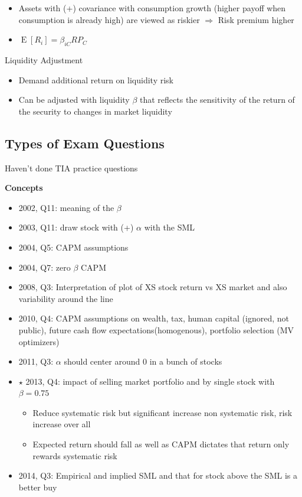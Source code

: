 \documentclass[]{book}
\providecommand{\tightlist}{%
  \setlength{\itemsep}{0pt}\setlength{\parskip}{0pt}}
\theoremstyle{definition}
\theoremstyle{definition}
\theoremstyle{remark}
\begin{document}
\begin{itemize}
\item
  Assets with (+) covariance with consumption growth (higher payoff when
  consumption is already high) are viewed as riskier \(\Rightarrow\)
  Risk premium higher
\item
  \(\operatorname{E}[R_i] = \beta_{iC}RP_C\)
\end{itemize}

Liquidity Adjustment

\begin{itemize}
\item
  Demand additional return on liquidity risk
\item
  Can be adjusted with liquidity \(\beta\) that reflects the sensitivity
  of the return of the security to changes in market liquidity
\end{itemize}

\subsection{Types of Exam Questions}\label{types-of-exam-questions-3}

{Haven't done TIA practice questions}

\textbf{Concepts}

\begin{itemize}
\tightlist
\item
  2002, Q11: meaning of the \(\beta\)
\item
  2003, Q11: draw stock with (+) \(\alpha\) with the SML
\item
  2004, Q5: CAPM assumptions
\item
  2004, Q7: zero \(\beta\) CAPM
\item
  2008, Q3: Interpretation of plot of XS stock return vs XS market and
  also variability around the line
\item
  2010, Q4: CAPM assumptions on wealth, tax, human capital (ignored, not
  public), future cash flow expectations(homogenous), portfolio
  selection (MV optimizers)
\item
  2011, Q3: \(\alpha\) should center around 0 in a bunch of stocks
\item
  \(\star\) 2013, Q4: impact of selling market portfolio and by single
  stock with \(\beta = 0.75\)

  \begin{itemize}
  \tightlist
  \item
    Reduce systematic risk but significant increase non systematic risk,
    risk increase over all
  \item
    Expected return should fall as well as CAPM dictates that return
    only rewards systematic risk
  \end{itemize}
\item
  2014, Q3: Empirical and implied SML and that for stock above the SML
  is a better buy
\end{itemize}
\end{document}
